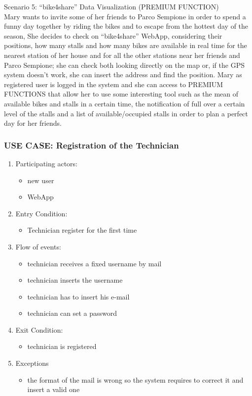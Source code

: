 \documentclass{article}
\begin{document}
Scenario 5: “bike4share” Data Visualization (PREMIUM FUNCTION) \\
Mary wants to invite some of her friends to Parco Sempione in order to spend a funny day together by riding the bikes and to escape from the hottest day of the season, 
She decides to check on “bike4share” WebApp, considering their positions, how many stalls and how many bikes are available in real time for the nearest station of her house and for all the other stations near her friends and Parco Sempione; she can check both looking directly on the map or, if the GPS system doesn’t work, she can insert the address and find the position.
Mary as registered user is logged in the system and she can access to PREMIUM FUNCTIONS that allow her to use some interesting tool such as the mean of available bikes and stalls in a certain time, the notification of full over a certain level of the stalls and a list of available/occupied stalls  in order to plan a perfect day for her friends.

\subsubsection{\textbf{USE CASE}: Registration of the Technician}
\begin{enumerate}
\item Participating actors: 
\begin{itemize}
    \item new user
    \item WebApp
\end{itemize}
\item Entry Condition: 
\begin{itemize}
    \item Technician register for the first time
\end{itemize}
\item Flow of events: 
\begin{itemize}
    \item technician receives a fixed username by mail
    \item technician inserts the username
    \item technician has to insert his e-mail
    \item technician can set a password
\end{itemize}
\item Exit Condition: 
\begin{itemize}
    \item technician is registered 
\end{itemize}
\item Exceptions
\begin{itemize}
    \item the format of the mail is wrong so the system requires to correct it and insert a valid one
\end{itemize}
\end{enumerate}
\end{document}
